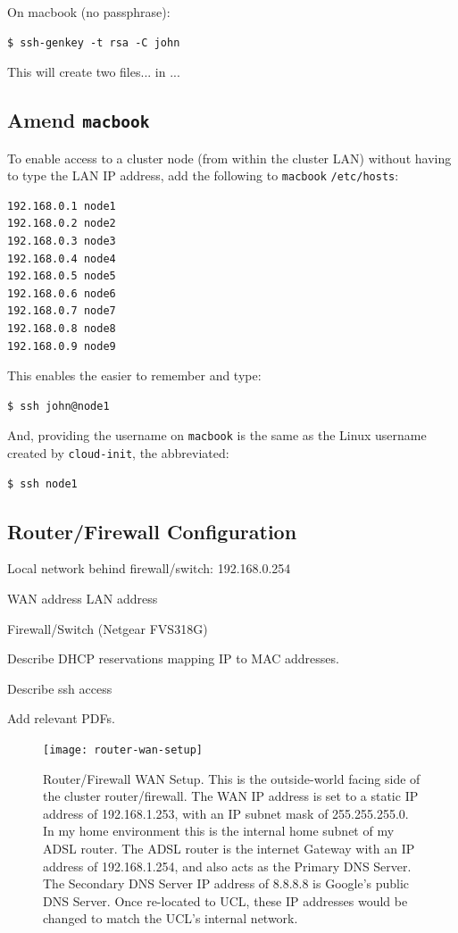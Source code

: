 \documentclass{report}
\begin{document}
On macbook (no passphrase):

\begin{lstlisting}[]
$ ssh-genkey -t rsa -C john
\end{lstlisting}

This will create two files... in ...


\subsection{Amend \texttt{macbook} }

To enable access to a cluster node (from within the cluster LAN) without having to type the LAN IP address, add the following to \verb|macbook| \verb|/etc/hosts|:

\lstset{style=listing}
\begin{lstlisting}[numbers=none, caption=/etc/hosts]
192.168.0.1 node1
192.168.0.2 node2
192.168.0.3 node3
192.168.0.4 node4
192.168.0.5 node5
192.168.0.6 node6
192.168.0.7 node7
192.168.0.8 node8
192.168.0.9 node9
\end{lstlisting}

This enables the easier to remember and type:

\lstset{style=type}
\begin{lstlisting}[]
$ ssh john@node1
\end{lstlisting}

And, providing the username on \verb|macbook| is the same as the Linux username created by \verb|cloud-init|,
the abbreviated:

\lstset{style=type}
\begin{lstlisting}[]
$ ssh node1
\end{lstlisting}




\subsection{Router/Firewall Configuration}

Local network behind firewall/switch: 192.168.0.254

WAN address
LAN address

Firewall/Switch (Netgear FVS318G)

Describe DHCP reservations mapping IP to MAC addresses.

Describe ssh access

Add relevant PDFs.

\begin{figure}
	\centering	
	\texttt{[image: router-wan-setup]}
	\caption{Router/Firewall WAN Setup. This is the outside-world facing side of the cluster router/firewall. The WAN IP address is set to a static IP address of 192.168.1.253, with an IP subnet mask of 255.255.255.0. In my home environment this is the internal home subnet of my ADSL router. The ADSL router is the internet Gateway with an IP address of 192.168.1.254, and also acts as the Primary DNS Server. The Secondary DNS Server IP address of 8.8.8.8 is Google's public DNS Server. Once re-located to UCL, these IP addresses would be changed to match the UCL's internal network.}
\end{figure}
\end{document}
